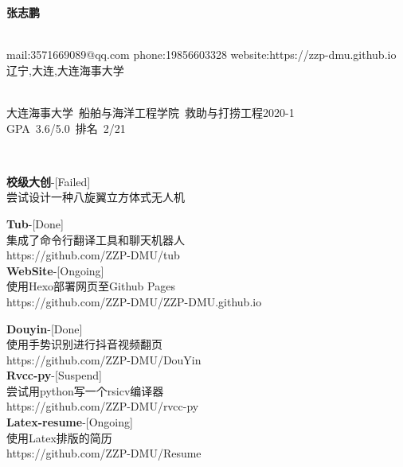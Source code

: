 \documentclass{ctexart}
\begin{document}
\pagestyle{empty}
\begin{center}
    \LARGE \textbf{张志鹏}
\end{center}
\begin{center}
\hrulefill \\
mail:3571669089@qq.com \qquad  phone:19856603328 \qquad website:https://zzp-dmu.github.io \\
辽宁,大连,大连海事大学 \\
\end{center} 
\vspace{0.1in}

 
\begin{center}
    \hrulefill \\
    \mbox{大连海事大学 \qquad 船舶与海洋工程学院 \qquad 救助与打捞工程2020-1 } \\
    \mbox{GPA 3.6/5.0 \quad 排名 2/21} 
\end{center}



\begin{center}
    \hrulefill \\
    \begin{minipage}[t]{18em}
        \textbullet \textbf{校级大创}-[Failed] \\
        尝试设计一种八旋翼立方体式无人机
        
        \textbullet \textbf{Tub}-[Done] \\
        集成了命令行翻译工具和聊天机器人\\
        https://github.com/ZZP-DMU/tub \\
        \textbullet \textbf{WebSite}-[Ongoing] \\
        使用Hexo部署网页至Github Pages \\
        https://github.com/ZZP-DMU/ZZP-DMU.github.io \\
    \end{minipage}
    \begin{minipage}[t]{18em}
        \textbullet \textbf{Douyin}-[Done] \\
        使用手势识别进行抖音视频翻页 \\
        https://github.com/ZZP-DMU/DouYin \\
        \textbullet \textbf{Rvcc-py}-[Suspend] \\
        尝试用python写一个rsicv编译器 \\
        https://github.com/ZZP-DMU/rvcc-py \\
        \textbullet \textbf{Latex-resume}-[Ongoing] \\
        使用Latex排版的简历 \\
        https://github.com/ZZP-DMU/Resume \\
    \end{minipage}
\end{center}
\end{document}
